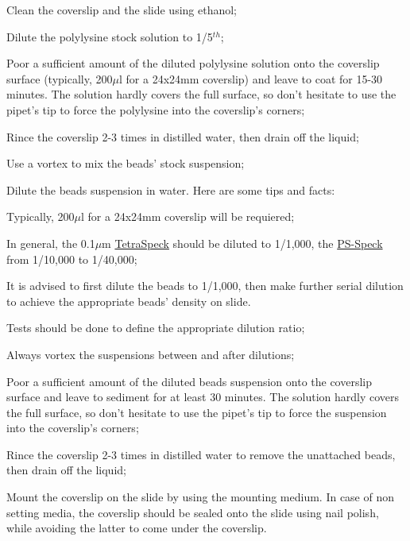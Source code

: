 \documentclass[a4paper, 11pt]{report}%
\begin{document}
\begin{enumerate*}
	\item Clean the coverslip and the slide using ethanol;
	\item Dilute the polylysine stock solution to 1/5$^{th}$;
	\item Poor a sufficient amount of the diluted polylysine solution onto the coverslip surface (typically, 200$\mu$l for a 24x24mm coverslip) and leave to coat for 15-30 minutes. The solution hardly covers the full surface, so don't hesitate to use the pipet's tip to force the polylysine into the coverslip's corners; 
	\item Rince the coverslip 2-3 times in distilled water, then drain off the liquid;
	\item Use a vortex to mix the beads' stock suspension;
	\item Dilute the beads suspension in water. Here are some tips and facts:
		\begin{itemize*}
			\item Typically, 200$\mu$l for a 24x24mm coverslip will be requiered;
			\item In general, the 0.1$\mu$m \href{http://probes.invitrogen.com/media/pis/mp07279.pdf}{TetraSpeck} should be diluted to 1/1,000, the \href{http://probes.invitrogen.com/media/pis/mp07220.pdf}{PS-Speck} from 1/10,000 to 1/40,000;
			\item It is advised to first dilute the beads to 1/1,000, then make further serial dilution to achieve the appropriate beads' density on slide.
			\item Tests should be done to define the appropriate dilution ratio;
			\item Always vortex the suspensions between and after dilutions;
		\end{itemize*}
	\item Poor a sufficient amount of the diluted beads suspension onto the coverslip surface and leave to sediment for at least 30 minutes. The solution hardly covers the full surface, so don't hesitate to use the pipet's tip to force the suspension into the coverslip's corners; 
	\item Rince the coverslip 2-3 times in distilled water to remove the unattached beads, then drain off the liquid;
	\item Mount the coverslip on the slide by using the mounting medium. In case of non setting media, the coverslip should be sealed onto the slide using nail polish, while avoiding the latter to come under the coverslip.
\end{enumerate*}
\end{document}
